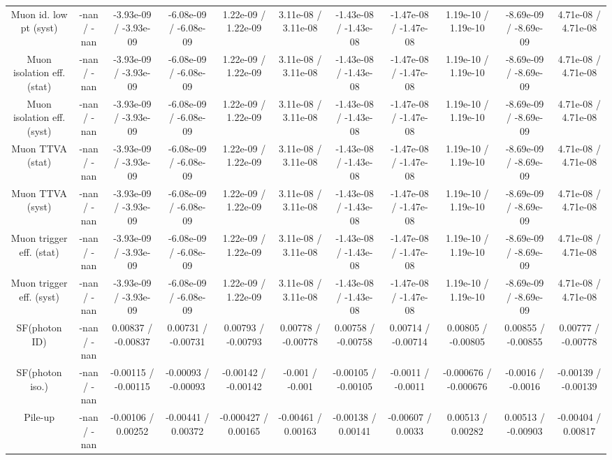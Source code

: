 \begin{table}[htbp]
\begin{center}
\begin{tabular}{|c|c|c|c|c|c|c|c|c|c|c|}
  Muon id. low pt (syst) & -nan / -nan & -3.93e-09 / -3.93e-09 & -6.08e-09 / -6.08e-09 & 1.22e-09 / 1.22e-09 & 3.11e-08 / 3.11e-08 & -1.43e-08 / -1.43e-08 & -1.47e-08 / -1.47e-08 & 1.19e-10 / 1.19e-10 & -8.69e-09 / -8.69e-09 & 4.71e-08 / 4.71e-08 \\ 
  Muon isolation eff. (stat) & -nan / -nan & -3.93e-09 / -3.93e-09 & -6.08e-09 / -6.08e-09 & 1.22e-09 / 1.22e-09 & 3.11e-08 / 3.11e-08 & -1.43e-08 / -1.43e-08 & -1.47e-08 / -1.47e-08 & 1.19e-10 / 1.19e-10 & -8.69e-09 / -8.69e-09 & 4.71e-08 / 4.71e-08 \\ 
  Muon isolation eff. (syst) & -nan / -nan & -3.93e-09 / -3.93e-09 & -6.08e-09 / -6.08e-09 & 1.22e-09 / 1.22e-09 & 3.11e-08 / 3.11e-08 & -1.43e-08 / -1.43e-08 & -1.47e-08 / -1.47e-08 & 1.19e-10 / 1.19e-10 & -8.69e-09 / -8.69e-09 & 4.71e-08 / 4.71e-08 \\ 
  Muon TTVA (stat) & -nan / -nan & -3.93e-09 / -3.93e-09 & -6.08e-09 / -6.08e-09 & 1.22e-09 / 1.22e-09 & 3.11e-08 / 3.11e-08 & -1.43e-08 / -1.43e-08 & -1.47e-08 / -1.47e-08 & 1.19e-10 / 1.19e-10 & -8.69e-09 / -8.69e-09 & 4.71e-08 / 4.71e-08 \\ 
  Muon TTVA (syst) & -nan / -nan & -3.93e-09 / -3.93e-09 & -6.08e-09 / -6.08e-09 & 1.22e-09 / 1.22e-09 & 3.11e-08 / 3.11e-08 & -1.43e-08 / -1.43e-08 & -1.47e-08 / -1.47e-08 & 1.19e-10 / 1.19e-10 & -8.69e-09 / -8.69e-09 & 4.71e-08 / 4.71e-08 \\ 
  Muon trigger eff. (stat) & -nan / -nan & -3.93e-09 / -3.93e-09 & -6.08e-09 / -6.08e-09 & 1.22e-09 / 1.22e-09 & 3.11e-08 / 3.11e-08 & -1.43e-08 / -1.43e-08 & -1.47e-08 / -1.47e-08 & 1.19e-10 / 1.19e-10 & -8.69e-09 / -8.69e-09 & 4.71e-08 / 4.71e-08 \\ 
  Muon trigger eff. (syst) & -nan / -nan & -3.93e-09 / -3.93e-09 & -6.08e-09 / -6.08e-09 & 1.22e-09 / 1.22e-09 & 3.11e-08 / 3.11e-08 & -1.43e-08 / -1.43e-08 & -1.47e-08 / -1.47e-08 & 1.19e-10 / 1.19e-10 & -8.69e-09 / -8.69e-09 & 4.71e-08 / 4.71e-08 \\ 
  SF(photon ID) & -nan / -nan & 0.00837 / -0.00837 & 0.00731 / -0.00731 & 0.00793 / -0.00793 & 0.00778 / -0.00778 & 0.00758 / -0.00758 & 0.00714 / -0.00714 & 0.00805 / -0.00805 & 0.00855 / -0.00855 & 0.00777 / -0.00778 \\ 
  SF(photon iso.) & -nan / -nan & -0.00115 / -0.00115 & -0.00093 / -0.00093 & -0.00142 / -0.00142 & -0.001 / -0.001 & -0.00105 / -0.00105 & -0.0011 / -0.0011 & -0.000676 / -0.000676 & -0.0016 / -0.0016 & -0.00139 / -0.00139 \\ 
  Pile-up & -nan / -nan & -0.00106 / 0.00252 & -0.00441 / 0.00372 & -0.000427 / 0.00165 & -0.00461 / 0.00163 & -0.00138 / 0.00141 & -0.00607 / 0.0033 & 0.00513 / 0.00282 & 0.00513 / -0.00903 & -0.00404 / 0.00817 \\ 

\end{tabular}
\end{center}
\end{table}
